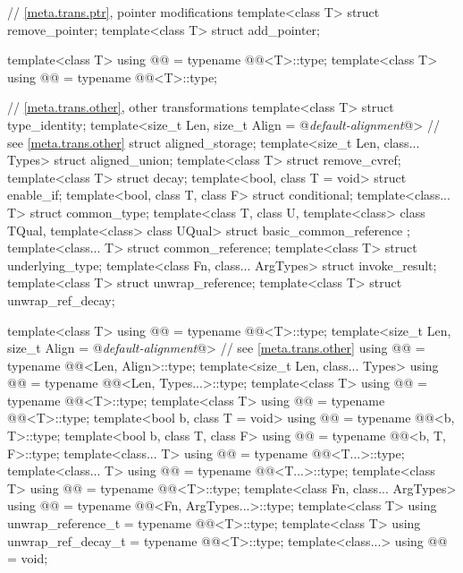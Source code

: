 \begin{codeblock}
{  // \ref{meta.trans.ptr}, pointer modifications
  template<class T> struct remove_pointer;
  template<class T> struct add_pointer;

  template<class T>
    using @@ = typename @@<T>::type;
  template<class T>
    using @@    = typename @@<T>::type;

  // \ref{meta.trans.other}, other transformations
  template<class T> struct type_identity;
  template<size_t Len, size_t Align = @\textit{default-alignment}@> // see \ref{meta.trans.other}
    struct aligned_storage;
  template<size_t Len, class... Types> struct aligned_union;
  template<class T> struct remove_cvref;
  template<class T> struct decay;
  template<bool, class T = void> struct enable_if;
  template<bool, class T, class F> struct conditional;
  template<class... T> struct common_type;
  template<class T, class U, template<class> class TQual, template<class> class UQual>
    struct basic_common_reference { };
  template<class... T> struct common_reference;
  template<class T> struct underlying_type;
  template<class Fn, class... ArgTypes> struct invoke_result;
  template<class T> struct unwrap_reference;
  template<class T> struct unwrap_ref_decay;

  template<class T>
    using @@    = typename @@<T>::type;
  template<size_t Len, size_t Align = @\textit{default-alignment}@> // see \ref{meta.trans.other}
    using @@  = typename @@<Len, Align>::type;
  template<size_t Len, class... Types>
    using @@    = typename @@<Len, Types...>::type;
  template<class T>
    using @@     = typename @@<T>::type;
  template<class T>
    using @@            = typename @@<T>::type;
  template<bool b, class T = void>
    using @@        = typename @@<b, T>::type;
  template<bool b, class T, class F>
    using @@      = typename @@<b, T, F>::type;
  template<class... T>
    using @@      = typename @@<T...>::type;
  template<class... T>
    using @@ = typename @@<T...>::type;
  template<class T>
    using @@  = typename @@<T>::type;
  template<class Fn, class... ArgTypes>
    using @@    = typename @@<Fn, ArgTypes...>::type;
  template<class T>
    using unwrap_reference_t = typename @@<T>::type;
  template<class T>
    using unwrap_ref_decay_t = typename @@<T>::type;
  template<class...>
    using @@             = void;

}
\end{codeblock}
